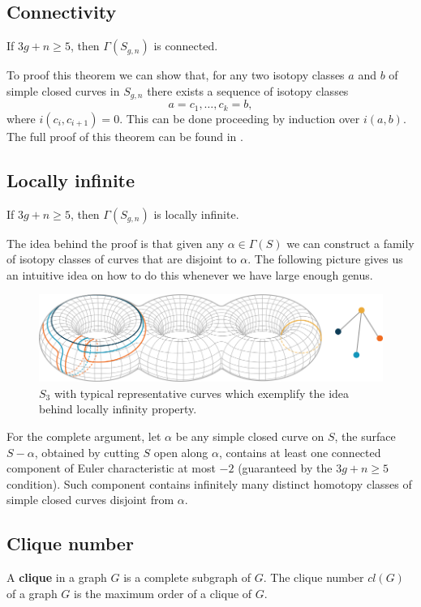 \subsection{Connectivity}
\begin{theorem}
If $3g+n\geq 5$, then $\Gamma(S_{g,n})$ is connected.
\end{theorem}

To proof this theorem we can show that, for any two isotopy classes $a$ and $b$ of simple closed curves in $S_{g,n}$ there exists a sequence of isotopy classes
$$a=c_{1},\dots,c_{k}=b,$$
where $i(c_{i},c_{i+1})=0$. This can be done proceeding by induction over $i(a,b)$. The full proof of this theorem can be found in \cite[Farb, p.~93]{Farb}.

\subsection{Locally infinite}
\begin{theorem}
If $3g+n\geq 5$, then $\Gamma(S_{g,n})$ is locally infinite.
\end{theorem}
The idea behind the proof is that given any $\alpha \in \Gamma(S)$ we can construct a family of isotopy classes of curves that are disjoint to $\alpha$. The following picture gives us an intuitive idea on how to do this whenever we have large enough genus.
\vspace{0.5cm}
\begin{figure}[h!]
	\centering
	\includegraphics[scale=0.6]{Figures/Locally-infinite.png}
	\caption{$S_{3}$ with typical representative curves which exemplify the idea behind locally infinity property.}
\end{figure}

For the complete argument, let $\alpha$ be any simple closed curve on $S$, the surface $S-\alpha$, obtained by cutting $S$ open along $\alpha$, contains at least one connected component of Euler characteristic at most $-2$ (guaranteed by the $3g+n\geq 5$ condition). Such component contains infinitely many distinct homotopy classes of simple closed curves disjoint from $\alpha$.

\subsection{Clique number}
A \textbf{clique} in a graph $G$ is a complete subgraph of $G$. The clique number $cl(G)$ of a graph $G$ is the maximum order of a clique of $G$.

